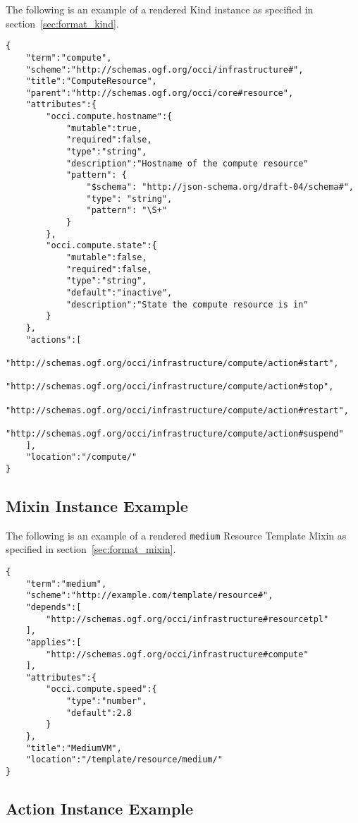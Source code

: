 \documentclass[10pt,a4paper]{article}
\begin{document}
\begin{appendices}
The following is an example of a rendered Kind instance as specified in section~\ref{sec:format_kind}.

\begin{lstlisting}
{
    "term":"compute",
    "scheme":"http://schemas.ogf.org/occi/infrastructure#",
    "title":"ComputeResource",
    "parent":"http://schemas.ogf.org/occi/core#resource",
    "attributes":{
        "occi.compute.hostname":{
            "mutable":true,
            "required":false,
            "type":"string",
            "description":"Hostname of the compute resource"
            "pattern": {
                "$schema": "http://json-schema.org/draft-04/schema#",
                "type": "string",
                "pattern": "\S+"
            }
        },
        "occi.compute.state":{
            "mutable":false,
            "required":false,
            "type":"string",
            "default":"inactive",
            "description":"State the compute resource is in"
        }
    },
    "actions":[
        "http://schemas.ogf.org/occi/infrastructure/compute/action#start",
        "http://schemas.ogf.org/occi/infrastructure/compute/action#stop",
        "http://schemas.ogf.org/occi/infrastructure/compute/action#restart",
        "http://schemas.ogf.org/occi/infrastructure/compute/action#suspend"
    ],
    "location":"/compute/"
}
\end{lstlisting}

\subsection{Mixin Instance Example}
\label{mixin_instance_rendering_example}

The following is an example of a rendered \texttt{medium} Resource Template Mixin as specified in section~\ref{sec:format_mixin}.

\begin{lstlisting}
{
    "term":"medium",
    "scheme":"http://example.com/template/resource#",
    "depends":[
        "http://schemas.ogf.org/occi/infrastructure#resourcetpl"
    ],
    "applies":[
        "http://schemas.ogf.org/occi/infrastructure#compute"
    ],
    "attributes":{
        "occi.compute.speed":{
            "type":"number",
            "default":2.8
        }
    },
    "title":"MediumVM",
    "location":"/template/resource/medium/"
}
\end{lstlisting}


\subsection{Action Instance Example}
\label{action_instance_rendering_example}


\end{appendices}
\end{document}
